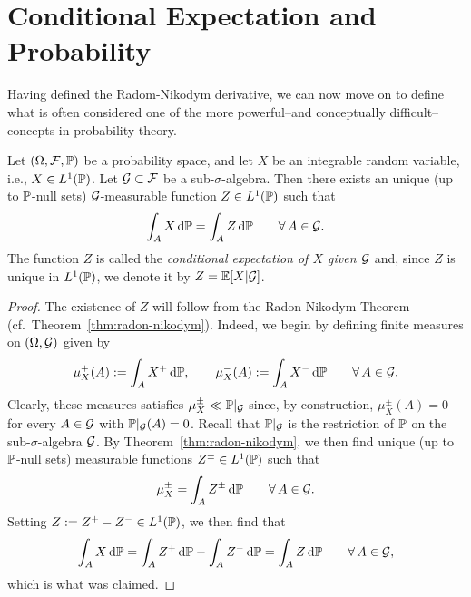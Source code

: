 




\section{Conditional Expectation and Probability}

Having defined the Radom-Nikodym derivative, we can now move on to define what is often considered one of the more powerful--and conceptually difficult--concepts in probability theory.

\begin{theorem}\label{def:conditional_expectation}
Let $(\Omega,\mathcal F,\mathbb P)$ be a probability space, and let $X$ be an integrable random variable, i.e., $X\in L^1(\mathbb P)$. Let $\mathcal G\subset\mathcal F$ be a sub-$\sigma$-algebra. Then there exists an unique (up to $\mathbb P$-null sets) $\mathcal G$-measurable function $Z\in L^1(\mathbb P)$ such that
\[
	\int_A X\,\mathrm{d}\mathbb P = \int_A Z\,\mathrm{d}\mathbb P\qquad\forall\,A\in\mathcal G.
\]
The function $Z$ is called the \emph{conditional expectation of $X$ given $\mathcal G$} and, since $Z$ is unique in $L^1(\mathbb P)$, we denote it by $Z=\mathbb E[X|\mathcal G]$.
\end{theorem}

\begin{proof}
The existence of $Z$ will follow from the Radon-Nikodym Theorem (cf.\ Theorem~\ref{thm:radon-nikodym}). Indeed, we begin by defining finite measures on $(\Omega,\mathcal G)$ given by
\[
	\mu_X^+(A) := \int_A X^+\,\mathrm{d}\mathbb P,\qquad \mu_X^-(A) := \int_A X^-\,\mathrm{d}\mathbb P\qquad\forall\,A\in\mathcal G.
\]
Clearly, these measures satisfies $\mu_X^\pm\ll \mathbb P|_{\mathcal G}$ since, by construction, $\mu_X^\pm(A)=0$ for every $A\in\mathcal G$ with $\mathbb P|_{\mathcal G}(A)=0$. Recall that $\mathbb P|_{\mathcal G}$ is the restriction of $\mathbb P$ on the sub-$\sigma$-algebra $\mathcal G$. By Theorem~\ref{thm:radon-nikodym}, we then find unique (up to $\mathbb P$-null sets) measurable functions $Z^\pm\in L^1(\mathbb P)$ such that
\[
	\mu_X^\pm = \int_A Z^\pm\,\mathrm{d}\mathbb P\qquad\forall\,A\in\mathcal G.
\]
Setting $Z:= Z^+-Z^-\in L^1(\mathbb P)$, we then find that
\[
	\int_A X\,\mathrm{d}\mathbb P = \int_A Z^+\,\mathrm{d}\mathbb P - \int_A Z^-\,\mathrm{d}\mathbb P = \int_A Z\,\mathrm{d}\mathbb P\qquad \forall\,A\in\mathcal G,
\]
which is what was claimed.
\end{proof}

